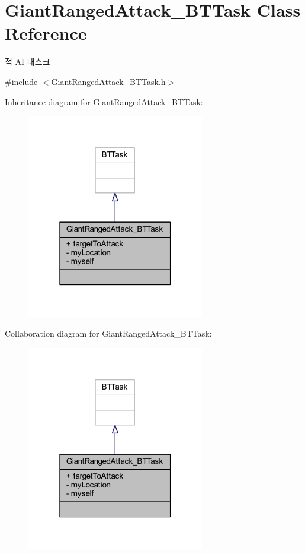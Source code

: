 \hypertarget{class_giant_ranged_attack___b_t_task}{}\section{Giant\+Ranged\+Attack\+\_\+\+B\+T\+Task Class Reference}
\label{class_giant_ranged_attack___b_t_task}


적 AI 태스크  




{\ttfamily \#include $<$Giant\+Ranged\+Attack\+\_\+\+B\+T\+Task.\+h$>$}



Inheritance diagram for Giant\+Ranged\+Attack\+\_\+\+B\+T\+Task\+:\nopagebreak
\begin{figure}[H]
\begin{center}
\leavevmode
\includegraphics[width=220pt]{class_giant_ranged_attack___b_t_task__inherit__graph}
\end{center}
\end{figure}


Collaboration diagram for Giant\+Ranged\+Attack\+\_\+\+B\+T\+Task\+:\nopagebreak
\begin{figure}[H]
\begin{center}
\leavevmode
\includegraphics[width=220pt]{class_giant_ranged_attack___b_t_task__coll__graph}
\end{center}
\end{figure}
